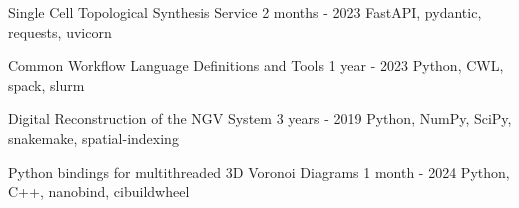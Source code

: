 


\begin{cventries}

\cvproject
{Single Cell Topological Synthesis Service} %
{2 months - 2023} %
{ %
    \href{https://github.com/BlueBrain/morphology-synthesis-api}{\faGithubSquare}
    FastAPI, pydantic, requests, uvicorn
}

\cvproject
{Common Workflow Language Definitions and Tools}
{1 year - 2023}
{
  \href{https://github.com/BlueBrain/blue-cwl}{\faGithubSquare}
  Python, CWL, spack, slurm
}



\cvproject
{Digital Reconstruction of the NGV System} %
{3 years - 2019} %
{ %
    \href{https://github.com/BlueBrain/ArchNGV}{\faGithubSquare}
    Python, NumPy, SciPy, snakemake, spatial-indexing
}


\cvproject
{Python bindings for multithreaded 3D Voronoi Diagrams} %
{1 month - 2024} %
{ %
    \href{https://github.com/eleftherioszisis/multivoro}{\faGithubSquare}
    Python, C++, nanobind, cibuildwheel
}


\end{cventries}
